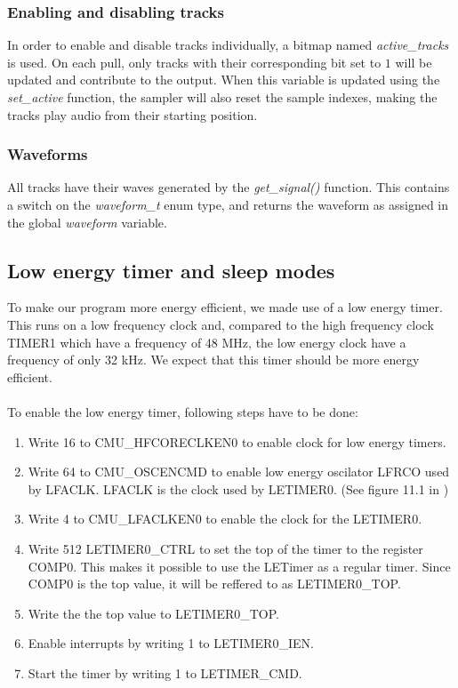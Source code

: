 \subsubsection{Enabling and disabling tracks}
In order to enable and disable tracks individually, a bitmap named \emph{active\_tracks} is used. On each pull, only tracks with their corresponding bit set to $1$ will be updated and contribute to the output. When this variable is updated using the \emph{set\_active} function, the sampler will also reset the sample indexes, making the tracks play audio from their starting position.

\subsubsection{Waveforms}
All tracks have their waves generated by the \emph{get\_signal()} function. This contains a switch on the \emph{waveform\_t} enum type, and returns the waveform as assigned in the global \emph{waveform} variable.


\subsection{Low energy timer and sleep modes}

To make our program more energy efficient, we made use of a low energy timer. This runs on a low frequency clock and, compared to the high frequency clock TIMER1 which have a frequency of 48 MHz, the low energy clock have a frequency of only 32 kHz. We expect that this timer should be more energy efficient.\\
\\
To enable the low energy timer, following steps have to be done:

\begin{enumerate}
	\item {Write 16 to CMU\_HFCORECLKEN0 to enable clock for low energy timers.}
	\item {Write 64 to CMU\_OSCENCMD to enable low energy oscilator LFRCO used by LFACLK. LFACLK is the clock used by LETIMER0. (See figure 11.1 in \cite{reference_manual})}
	\item {Write 4 to CMU\_LFACLKEN0 to enable the clock for the LETIMER0.}
	\item {Write 512 LETIMER0\_CTRL to set the top of the timer to the register COMP0. This makes it possible to use the LETimer as a regular timer. Since COMP0 is the top value, it will be reffered to as LETIMER0\_TOP.}
	\item {Write the the top value to LETIMER0\_TOP.}
	\item {Enable interrupts by writing 1 to LETIMER0\_IEN.}
	\item {Start the timer by writing 1 to LETIMER\_CMD.} 
\end{enumerate}

